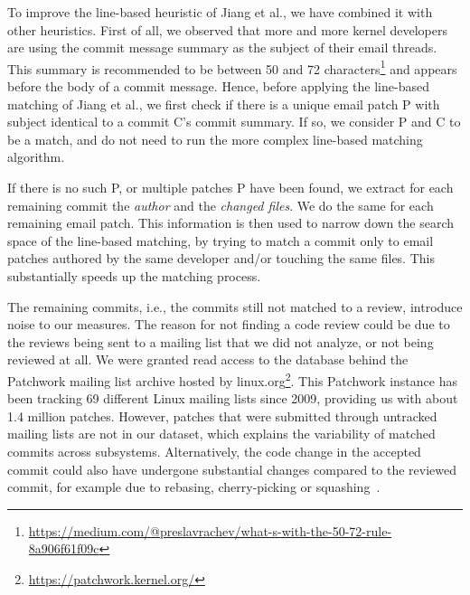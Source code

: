 To improve %
the line-based heuristic of Jiang et al., we have combined it with other heuristics. First of all, we observed that more and more kernel developers are using the commit message summary as the subject of their email threads. %
This summary is recommended to be between 50 and 72 characters\footnote{\url{https://medium.com/@preslavrachev/what-s-with-the-50-72-rule-8a906f61f09c}} and appears before the body of a commit message. Hence, before applying the line-based matching of Jiang et al., we first check if there is a unique email patch P with subject identical to a commit C's commit summary. If so, we consider P and C to be a match, and do not need to run the more complex line-based matching algorithm.

If there is no such P, or multiple patches P have been found, %
we extract for each remaining commit the \textit{author} and the \textit{changed files}. We do the same for each remaining email patch. This information is then used to narrow down the search space of the line-based matching, by trying to match a commit only to email patches authored by the same developer and/or touching the same files. This substantially speeds up the matching process.%

The remaining commits, i.e., the commits still not matched to a review, introduce noise to our measures. The reason for not finding a code review could be due to the reviews being sent to a mailing list that we did not analyze, or not being reviewed at all. We were granted read access to the database behind the Patchwork mailing list archive hosted by linux.org\footnote{\url{https://patchwork.kernel.org/}}. This Patchwork instance has been tracking 69 different Linux mailing lists since 2009, providing us with about 1.4 million patches. However, patches that were submitted through untracked mailing lists are not in our dataset, which explains the variability of matched commits across subsystems. Alternatively, the code change in the accepted commit could also have undergone substantial changes compared to the reviewed commit, for example due to rebasing, cherry-picking or squashing~\cite{Bird-2009}.

